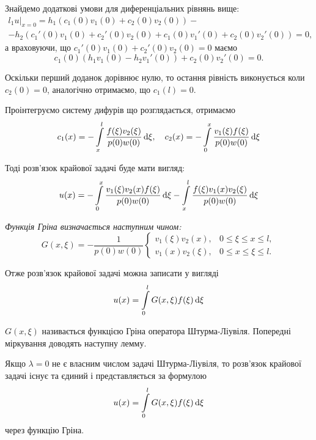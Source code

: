 Знайдемо додаткові умови для диференціальних рівнянь вище: 
\begin{multline} 
l_1u|_{x=0} = h_1(c_1(0)v_1(0) + c_2(0)v_2(0)) - \\
- h_2(c_1'(0)v_1(0) + c_2'(0)v_2(0) + c_1(0)v_1'(0) + c_2(0)v_2'(0)) = 0,
\end{multline}
а враховуючи, що $c_1'(0)v_1(0)+c_2'(0)v_2(0) = 0$ маємо
\begin{equation}
    c_1(0) (h_1v_1(0) - h_2v_1'(0)) + c_2(0)v_2'(0) = 0.
\end{equation}

Оскільки перший доданок дорівнює нулю, то остання рівність виконується коли $c_2(0) = 0$, аналогічно отримаємо, що $c_1(l) = 0$. \medskip

Проінтегруємо систему дифурів що розглядається, отримаємо
\begin{equation}
    c_1(x)=-\displaystyle\int\limits_x^l\dfrac{f(\xi)v_2(\xi)}{p(0)w(0)}\mathop{}\!\mathrm{d}\xi, \quad c_2(x)=-\displaystyle\int\limits_0^x\dfrac{v_1(\xi)f(\xi)}{p(0)w(0)}\mathop{}\!\mathrm{d}\xi
\end{equation}

Тоді розв'язок крайової задачі буде мати вигляд:
\begin{equation}
    u(x)=-\displaystyle\int\limits_0^x\dfrac{v_1(\xi)v_2(x)f(\xi)}{p(0)w(0)}\mathop{}\!\mathrm{d}\xi-\displaystyle\int\limits_x^l\dfrac{f(\xi)v_1(x)v_2(\xi)}{p(0)w(0)}\mathop{}\!\mathrm{d}\xi
\end{equation}

\begin{definition}
    \it{Функція Гріна} визначається наступним чином:
    \begin{equation}
        G(x, \xi) = - \dfrac{1}{p(0)w(0)} \begin{cases}
            v_1(\xi) v_2(x), & 0 \le \xi \le x \le l, \\
            v_1(x) v_2(\xi), & 0 \le x \le \xi \le l.
        \end{cases}
    \end{equation}
\end{definition}

Отже розв'язок крайової задачі можна записати у вигляді
\begin{equation}
    u(x) = \displaystyle\int\limits_0^l G(x, \xi) f(\xi) \mathop{}\!\mathrm{d} \xi
\end{equation}

$G(x, \xi)$ називається функцією Гріна оператора Штурма-Ліувіля. Попередні міркування доводять наступну лемму.
\begin{lemma}
    \label{lemma:2.5.5}
    Якщо $\lambda = 0$ не є власним числом задачі Штурма-Ліувіля, то розв'язок крайової задачі існує та єдиний і представляється за формулою
    \begin{equation}
        u(x) = \displaystyle\int\limits_0^l G(x, \xi) f(\xi) \mathop{}\!\mathrm{d} \xi
    \end{equation}
    через функцію Гріна.
\end{lemma}

